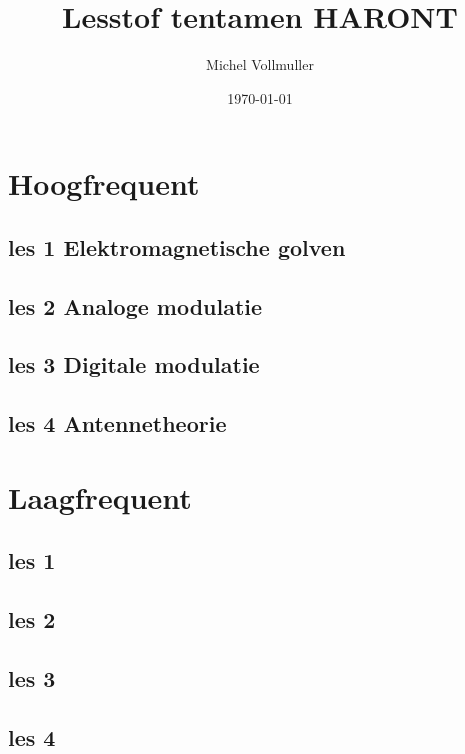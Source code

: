 \documentclass{article}
\begin{document}
\title{Lesstof tentamen HARONT}
\author{Michel Vollmuller}
\date{\today}

\maketitle


\tableofcontents

\newpage

\section{Hoogfrequent}

    \subsection{les 1 Elektromagnetische golven}
    

    \newpage
    \subsection{les 2 Analoge modulatie}
    

    \newpage
    \subsection{les 3 Digitale modulatie}
    

    \subsection{les 4 Antennetheorie}
    

\newpage

\section{Laagfrequent}

    \subsection{les 1}
    

    \subsection{les 2}
    

    \subsection{les 3}
    

    \subsection{les 4}
    
\end{document}
